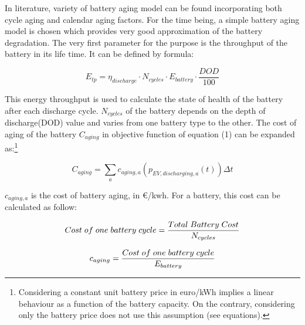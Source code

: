In literature, variety of battery aging model can be found incorporating both cycle aging and calendar aging factors. For the time being, a simple battery aging model is chosen which provides very good approximation of the battery degradation. The very first parameter for the purpose is the throughput of the battery in its life time. It can be defined by formula:

\[ 
    E_{tp} = \eta_{discharge}\cdot N_{cycles}\cdot E_{battery}\cdot \frac{DOD}{100}
\]

This energy throughput is used to calculate the state of health of the battery after each discharge cycle. $N_{cycles}$ of the battery depends on the depth of discharge(DOD) value and varies from one battery type to the other. The cost of aging of the battery $C_{aging}$ in objective function of equation (1) can be expanded as:\footnote{Considering a constant unit battery price in euro/kWh implies a linear behaviour as a function of the battery capacity. On the contrary, considering only the battery price does not use this assumption (see equations).}

\[ 
   C_{aging} = \sum_a c_{aging,a}\left (p_{EV,discharging,a}(t) \right) \Delta t
\]

$c_{aging,a}$ is the cost of battery aging, in €/kwh. For a battery, this cost can be calculated as follow: 

\[ 
   Cost \hspace{0.1cm} of \hspace{0.1cm} one \hspace{0.1cm} battery \hspace{0.1cm} cycle = \frac{Total \hspace{0.1cm} Battery \hspace{0.1cm} Cost}{N_{cycles}}
\]

\[ 
   c_{aging }= \frac{Cost \hspace{0.1cm} of \hspace{0.1cm} one \hspace{0.1cm} battery \hspace{0.1cm} cycle}{E_{battery}} 
\]